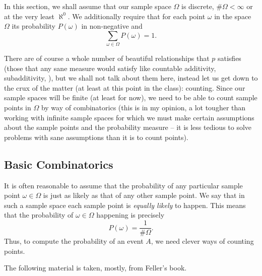 In this section, we shall assume that our sample space \(\Omega\) is
discrete, \ie{} \(\#\Omega<\infty\) or at the very least \(\aleph^0\). We
additionally require that for each point \(\omega\) in the space \(\Omega\)
its probability \(P(\omega)\) in non-negative and
\begin{equation}
  \label{eq:convention-prob}
  \sum_{\omega\in\Omega}P(\omega)=1.
\end{equation}

There are of course a whole number of beautiful relationships that \(p\)
satisfies (those that any sane measure would satisfy like countable
additivity, subadditivity, \etc{}), but we shall not talk about them here,
instead let us get down to the crux of the matter (at least at this point
in the class): counting. Since our sample spaces will be finite (at least
for now), we need to be able to count sample points in \(\Omega\) by way of
combinatorics (this is in my opinion, a lot tougher than working with
infinite sample spaces for which we must make certain assumptions about the
sample points and the probability measure -- it is less tedious to solve
problems with sane assumptions than it is to count points).

\subsection{Basic Combinatorics}
It is often reasonable to assume that the probability of any particular
sample point \(\omega\in\Omega\) is just as likely as that of any other
sample point. We say that in such a sample space each sample point is
\emph{equally likely} to happen. This means that the probability of
\(\omega\in\Omega\) happening is precisely
\[
  P(\omega)=\frac{1}{\#\Omega}.
\]
Thus, to compute the probability of an event \(A\), we need clever ways of
counting points.

The following material is taken, mostly, from Feller's book.


